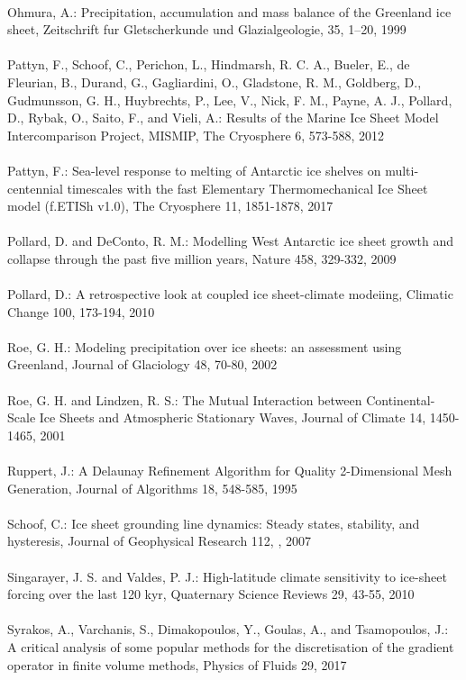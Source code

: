 \documentclass{article}
\begin{document}
\\
Ohmura, A.: Precipitation, accumulation and mass balance of the Greenland ice sheet, Zeitschrift fur Gletscherkunde und Glazialgeologie, 35, 1–20, 1999\\
\\
Pattyn, F., Schoof, C., Perichon, L., Hindmarsh, R. C. A., Bueler, E., de Fleurian, B., Durand, G., Gagliardini, O., Gladstone, R. M., Goldberg, D., Gudmunsson, G. H., Huybrechts, P., Lee, V., Nick, F. M., Payne, A. J., Pollard, D., Rybak, O., Saito, F., and Vieli, A.: Results of the Marine Ice Sheet Model Intercomparison Project, MISMIP, The Cryosphere 6, 573-588, 2012\\
\\
Pattyn, F.: Sea-level response to melting of Antarctic ice shelves on multi-centennial timescales with the fast Elementary Thermomechanical Ice Sheet model (f.ETISh v1.0), The Cryosphere 11, 1851-1878, 2017\\
\\
Pollard, D. and DeConto, R. M.: Modelling West Antarctic ice sheet growth and collapse through the past five million years, Nature 458, 329-332, 2009\\
\\
Pollard, D.: A retrospective look at coupled ice sheet-climate modeiing, Climatic Change 100, 173-194, 2010\\
\\
Roe, G. H.: Modeling precipitation over ice sheets: an assessment using Greenland, Journal of Glaciology 48, 70-80, 2002\\
\\
Roe, G. H. and Lindzen, R. S.: The Mutual Interaction between Continental-Scale Ice Sheets and Atmospheric Stationary Waves, Journal of Climate 14, 1450-1465, 2001\\
\\
Ruppert, J.: A Delaunay Refinement Algorithm for Quality 2-Dimensional Mesh Generation, Journal of Algorithms 18, 548-585, 1995\\
\\
Schoof, C.: Ice sheet grounding line dynamics: Steady states, stability, and hysteresis, Journal of Geophysical Research 112, , 2007\\
\\
Singarayer, J. S. and Valdes, P. J.: High-latitude climate sensitivity to ice-sheet forcing over the last 120 kyr, Quaternary Science Reviews 29, 43-55, 2010\\
\\
Syrakos, A., Varchanis, S., Dimakopoulos, Y., Goulas, A., and Tsamopoulos, J.: A critical analysis of some popular methods for the discretisation of the gradient operator in finite volume methods, Physics of Fluids 29, 2017\\
\end{document}
